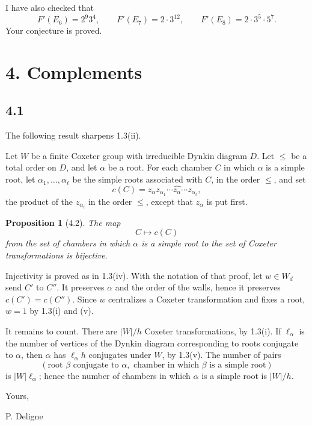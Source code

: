 \documentclass[11pt]{article}
\theoremstyle{plainen}
\newtheorem*{propositionx}{Proposition}
\begin{document}
I have also checked that
\[
 F'(E_6)=2^9 3^4,
 \qquad F'(E_7)=2\cdot 3^{12},
 \qquad F'(E_8)=2\cdot 3^5\cdot 5^7.
\]
Your conjecture is proved.

\section*{4. Complements}

\subsection*{4.1}
The following result sharpens 1.3(ii).

Let $W$ be a finite Coxeter group with irreducible Dynkin diagram $D$. Let $\leq$ be a total order on $D$, and let $\alpha$ be a root. For each chamber $C$ in which $\alpha$ is a simple root, let $\alpha_1,\ldots,\alpha_\ell$ be the simple roots associated with $C$, in the order $\leq$, and set
\[
 c(C)=z_\alpha z_{\alpha_1}\cdots \widehat{z_\alpha}\cdots z_{\alpha_\ell},
\]
the product of the $z_{\alpha_i}$ in the order $\leq$, except that $z_\alpha$ is put first.

\begin{propositionx}[4.2]
The map
\[
 C\longmapsto c(C)
\]
from the set of chambers in which $\alpha$ is a simple root to the set of Coxeter transformations is bijective.
\end{propositionx}

Injectivity is proved as in 1.3(iv). With the notation of that proof, let $w\in W_d$ send $C'$ to $C''$. It preserves $\alpha$ and the order of the walls, hence it preserves $c(C')=c(C'')$. Since $w$ centralizes a Coxeter transformation and fixes a root, $w=1$ by 1.3(i) and (v).

It remains to count. There are $|W|/h$ Coxeter transformations, by 1.3(i). If $\ell_\alpha$ is the number of vertices of the Dynkin diagram corresponding to roots conjugate to $\alpha$, then $\alpha$ has $\ell_\alpha h$ conjugates under $W$, by 1.3(v). The number of pairs
\[
(\text{root }\beta\text{ conjugate to }\alpha,
\text{ chamber in which }\beta\text{ is a simple root})
\]
is $|W|\ell_\alpha$; hence the number of chambers in which $\alpha$ is a simple root is $|W|/h$.

Yours,

\hfill P. Deligne
\end{document}
